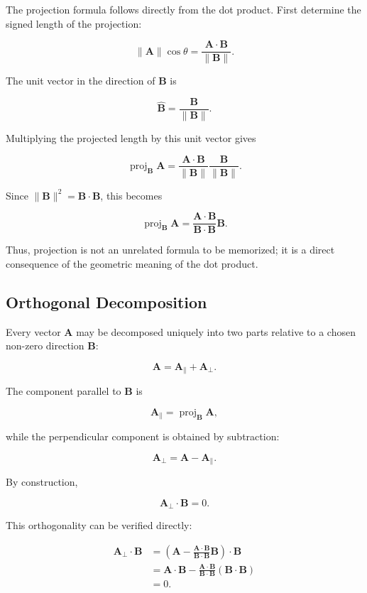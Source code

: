 The projection formula follows directly from the dot product. First determine
the signed length of the projection:

\[
\lVert\mathbf A\rVert\cos\theta
=
\frac{\mathbf A\cdot\mathbf B}{\lVert\mathbf B\rVert}.
\]

The unit vector in the direction of $\mathbf B$ is

\[
\widehat{\mathbf B}
=
\frac{\mathbf B}{\lVert\mathbf B\rVert}.
\]

Multiplying the projected length by this unit vector gives

\[
\operatorname{proj}_{\mathbf B}\mathbf A
=
\frac{\mathbf A\cdot\mathbf B}{\lVert\mathbf B\rVert}
\frac{\mathbf B}{\lVert\mathbf B\rVert}.
\]

Since $\lVert\mathbf B\rVert^2=\mathbf B\cdot\mathbf B$, this becomes

\[
\boxed{
\operatorname{proj}_{\mathbf B}\mathbf A
=
\frac{\mathbf A\cdot\mathbf B}{\mathbf B\cdot\mathbf B}\mathbf B.
}
\]

Thus, projection is not an unrelated formula to be memorized; it is a direct
consequence of the geometric meaning of the dot product.

\subsection{Orthogonal Decomposition}

Every vector $\mathbf A$ may be decomposed uniquely into two parts relative to
a chosen non-zero direction $\mathbf B$:

\[
\boxed{
\mathbf A=\mathbf A_{\parallel}+\mathbf A_{\perp}.
}
\]

The component parallel to $\mathbf B$ is

\[
\boxed{
\mathbf A_{\parallel}
=
\operatorname{proj}_{\mathbf B}\mathbf A,
}
\]

while the perpendicular component is obtained by subtraction:

\[
\boxed{
\mathbf A_{\perp}
=
\mathbf A-\mathbf A_{\parallel}.
}
\]

By construction,

\[
\mathbf A_{\perp}\cdot\mathbf B=0.
\]

This orthogonality can be verified directly:

\[
\begin{aligned}
\mathbf A_{\perp}\cdot\mathbf B
&=
\left(
\mathbf A
-
\frac{\mathbf A\cdot\mathbf B}{\mathbf B\cdot\mathbf B}\mathbf B
\right)\cdot\mathbf B
\\
&=
\mathbf A\cdot\mathbf B
-
\frac{\mathbf A\cdot\mathbf B}{\mathbf B\cdot\mathbf B}
(\mathbf B\cdot\mathbf B)
\\
&=0.
\end{aligned}
\]

